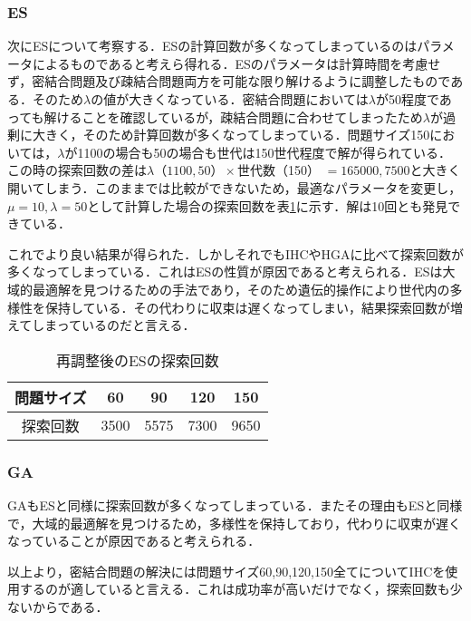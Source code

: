\documentclass[a4j]{jarticle}
\begin{document}
\subsubsection*{ES}
次にESについて考察する．ESの計算回数が多くなってしまっているのはパラメータによるものであると考えら得れる．ESのパラメータは計算時間を考慮せず，密結合問題及び疎結合問題両方を可能な限り解けるように調整したものである．そのため$\lambda$の値が大きくなっている．密結合問題においては$\lambda$が50程度であっても解けることを確認しているが，疎結合問題に合わせてしまったため$\lambda$が過剰に大きく，そのため計算回数が多くなってしまっている．問題サイズ150においては，$\lambda$が1100の場合も50の場合も世代は150世代程度で解が得られている．この時の探索回数の差は$\lambda （1100, 50） \times $世代数（150） $= 165000, 7500$と大きく開いてしまう．このままでは比較ができないため，最適なパラメータを変更し，$\mu = 10, \lambda = 50$として計算した場合の探索回数を表\ref{resultES}に示す．解は10回とも発見できている．\par
これでより良い結果が得られた．しかしそれでもIHCやHGAに比べて探索回数が多くなってしまっている．これはESの性質が原因であると考えられる．ESは大域的最適解を見つけるための手法であり，そのため遺伝的操作により世代内の多様性を保持している．その代わりに収束は遅くなってしまい，結果探索回数が増えてしまっているのだと言える．
\begin{table}[H]
 \begin{center}
  \caption{再調整後のESの探索回数}
  \label{resultES}
  \begin{tabular}[t]{|c|c|c|c|c|} \hline
問題サイズ & 60 & 90 & 120 & 150 \\ \hline
探索回数 & 3500 & 5575 & 7300 & 9650 \\  \hline
  \end{tabular}
 \end{center}
\end{table}

\subsubsection*{GA}
GAもESと同様に探索回数が多くなってしまっている．またその理由もESと同様で，大域的最適解を見つけるため，多様性を保持しており，代わりに収束が遅くなっていることが原因であると考えられる．\\ \par
以上より，密結合問題の解決には問題サイズ60,90,120,150全てについてIHCを使用するのが適していると言える．これは成功率が高いだけでなく，探索回数も少ないからである．
\end{document}
